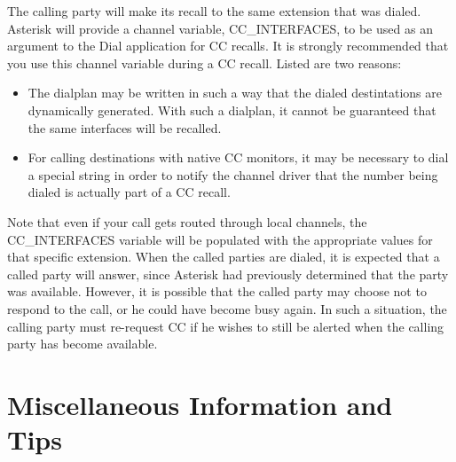 	The calling party will make its recall to the same extension
that was dialed. Asterisk will provide a channel variable,
CC\_INTERFACES, to be used as an argument to the Dial application
for CC recalls. It is strongly recommended that you use this
channel variable during a CC recall. Listed are two reasons:

\begin{itemize}
\item The dialplan may be written in such a way that the dialed
destintations are dynamically generated. With such a dialplan, it
cannot be guaranteed that the same interfaces will be recalled.
\item For calling destinations with native CC monitors, it may be
necessary to dial a special string in order to notify the channel
driver that the number being dialed is actually part of a CC recall.
\end{itemize}

	Note that even if your call gets routed through local channels,
the CC\_INTERFACES variable will be populated with the appropriate
values for that specific extension.
	When the called parties are dialed, it is expected that a called
party will answer, since Asterisk had previously determined that the
party was available. However, it is possible that the called party
may choose not to respond to the call, or he could have become busy
again. In such a situation, the calling party must re-request CC if
he wishes to still be alerted when the calling party has become
available.

\section{Miscellaneous Information and Tips}

